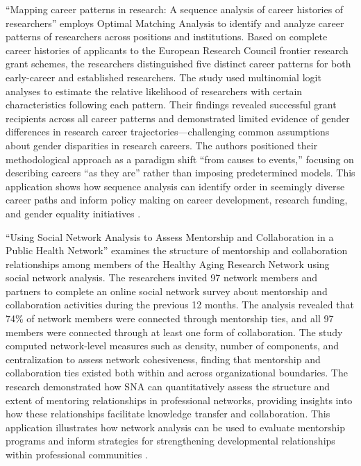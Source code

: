 \documentclass[main.tex]{subfiles}
\begin{document}
``Mapping career patterns in research: A sequence analysis of career histories of researchers'' employs Optimal Matching Analysis to identify and analyze career patterns of researchers across positions and institutions. Based on complete career histories of applicants to the European Research Council frontier research grant schemes, the researchers distinguished five distinct career patterns for both early-career and established researchers. The study used multinomial logit analyses to estimate the relative likelihood of researchers with certain characteristics following each pattern. Their findings revealed successful grant recipients across all career patterns and demonstrated limited evidence of gender differences in research career trajectories—challenging common assumptions about gender disparities in research careers. The authors positioned their methodological approach as a paradigm shift ``from causes to events,'' focusing on describing careers ``as they are'' rather than imposing predetermined models. This application shows how sequence analysis can identify order in seemingly diverse career paths and inform policy making on career development, research funding, and gender equality initiatives \cite{pmc2015mapping}.

``Using Social Network Analysis to Assess Mentorship and Collaboration in a Public Health Network'' examines the structure of mentorship and collaboration relationships among members of the Healthy Aging Research Network using social network analysis. The researchers invited 97 network members and partners to complete an online social network survey about mentorship and collaboration activities during the previous 12 months. The analysis revealed that 74\% of network members were connected through mentorship ties, and all 97 members were connected through at least one form of collaboration. The study computed network-level measures such as density, number of components, and centralization to assess network cohesiveness, finding that mentorship and collaboration ties existed both within and across organizational boundaries. The research demonstrated how SNA can quantitatively assess the structure and extent of mentoring relationships in professional networks, providing insights into how these relationships facilitate knowledge transfer and collaboration. This application illustrates how network analysis can be used to evaluate mentorship programs and inform strategies for strengthening developmental relationships within professional communities \cite{cdc2015network}.
\end{document}
